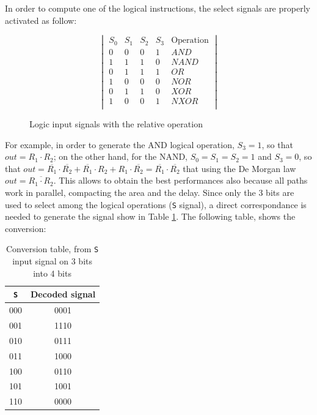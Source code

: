     In order to compute one of the logical instructions, the select signals are properly activated as follow:
    
    \begin{figure}[H]
        \centering
    \[
    \begin{vmatrix}
        S_0 & S_1 & S_2 & S_3 & \text{Operation}\\
        0 & 0 & 0 & 1 & AND \\
        1 & 1 & 1 & 0 & NAND \\
        0 & 1 & 1 & 1 & OR \\
        1 & 0 & 0 & 0 & NOR \\
        0 & 1 & 1 & 0 & XOR \\
        1 & 0 & 0 & 1 & NXOR \\
    \end{vmatrix}
    \]
      \caption{Logic input signals with the relative operation}
      \label{tab:log_sign}
\end{figure}
    
    For example, in order to generate the AND logical operation, $S_3 = 1$, so that $out = R_1 \cdot R_2$; on the other hand, for the NAND,  $S_0 = S_1 = S_2 = 1$ and $S_3 = 0$, so that $out = \overline{R_1} \cdot \overline{R_2} + \overline{R_1} \cdot R_2 + R_1 \cdot \overline{R_2} = \overline{R_1} \cdot \overline{R_2}$ that using the De Morgan law $out = \overline{R_1 \cdot R_2}$.
    This allows to obtain the best performances also because all paths work in parallel, compacting the area and the delay.\newline\newline
    Since only the 3 bits are used to select among the logical operations (\texttt{S} signal), a direct correspondance is needed to generate the signal show in Table \ref{tab:log_sign}. The following table, shows the conversion:
    \begin{table}[H]
        \begin{center}
            \begin{tabular}{ c| c}
                \texttt{S} & Decoded signal \\
                \hline
                000 & 0001 \\
                001 & 1110 \\
                010 & 0111 \\
                011 & 1000 \\
                100 & 0110 \\ 
                101 & 1001 \\ 
                110 & 0000 \\ 
                
            \end{tabular}
            \caption{Conversion table, from \texttt{S} input signal on 3 bits into 4 bits}
        \end{center}
    \end{table}

